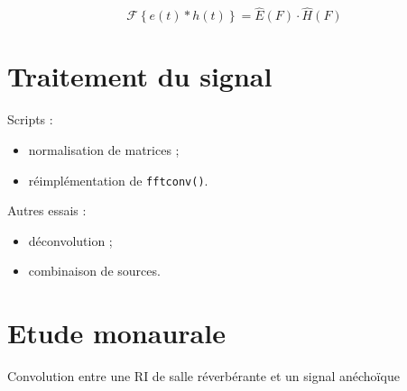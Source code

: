 \documentclass{beamer}
\begin{document}
\begin{frame}

\begin{figure}
\end{figure}

\begin{equation*}
\mathcal{F}\left\{e(t) \ast h(t)\right\} = \hat{E}(F) \cdot \hat{H}(F)
\end{equation*}
\end{frame}


\section{Traitement du signal}

\begin{frame}

Scripts :
\begin{itemize}
    \item normalisation de matrices ;
    \item réimplémentation de \texttt{fftconv()}.
\end{itemize}

Autres essais :
\begin{itemize}
    \item déconvolution ;
    \item combinaison de sources.
\end{itemize}
\end{frame}

\section{Etude monaurale}

\begin{frame}
\begin{figure}
\end{figure}
\begin{center}
Convolution entre une RI de salle réverbérante et un signal anéchoïque
\end{center}
\end{frame}
\end{document}
